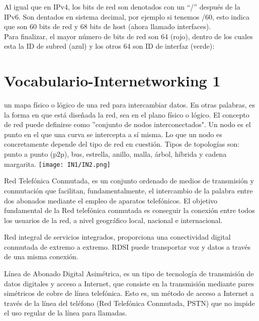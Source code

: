 \documentclass[
	12pt, %
	fleqn, %
	a4paper, %
	oneside, %
]{LegrandOrangeBook}
\begin{document}
Al igual que en IPv4, los bits de red son denotados con un ``/'' después de la IPv6. Son dentados en sistema decimal, por ejemplo si tenemos /60, esto indica que son 60 bits de red y 68 bits de host (ahora llamado interfaces).\\
Para finalizar, el mayor número de bits de red son 64 (rojo), dentro de los cuales esta la ID de subred (azul) y los otros 64 son ID de interfaz (verde):
\begin{center}
\ipAddress{\textcolor{red}{122:100:AD}:\textcolor{blue}{D2}:\textcolor{green}{120:0:0:FD}}
\end{center}
\newpage
\section*{Vocabulario-Internetworking 1}
\begin{vocabulary}
un mapa físico o lógico de una red para intercambiar datos. En otras palabras, es la forma en que está diseñada la red, sea en el plano físico o lógico. El concepto de red puede definirse como ''conjunto de nodos interconectados". Un nodo es el punto en el que una curva se intercepta a sí misma. Lo que un nodo es concretamente depende del tipo de red en cuestión. Tipos de topologías son: punto a punto (p2p), bus, estrella, anillo, malla, árbol, híbrida y cadena margarita.
\texttt{[image: IN1/IN2.png]}
\end{vocabulary}
\begin{vocabulary}[RTC]
Red Telefónica Conmutada, es un conjunto ordenado de medios de transmisión y conmutación que facilitan, fundamentalmente, el intercambio de la palabra entre dos abonados mediante el empleo de aparatos telefónicos. El objetivo fundamental de la Red telefónica conmutada es conseguir la conexión entre todos los usuarios de la red, a nivel geográfico local, nacional e internacional.
\end{vocabulary}
\begin{vocabulary}[RDSI]
Red integral de servicios integrados, proporciona una conectividad digital conmutada de extremo a extremo. RDSI puede transportar voz y datos a través de una misma conexión.
\end{vocabulary}
\begin{vocabulary}[ADSL]
Línea de Abonado Digital Asimétrica, es un tipo de tecnología de transmisión de datos digitales y acceso a Internet, que consiste en la transmisión mediante pares simétricos de cobre de línea telefónica. Esto es, un método de acceso a Internet a través de la línea del teléfono (Red Telefónica Conmutada, PSTN) que no impide el uso regular de la línea para llamadas.
\end{vocabulary}
\end{document}
